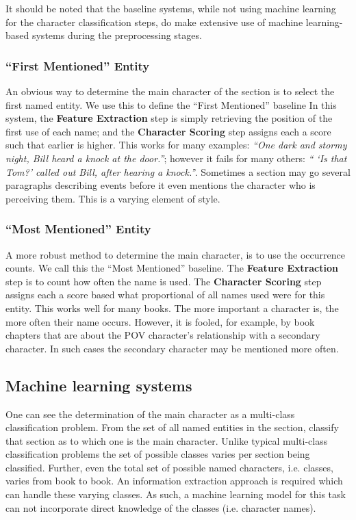 \documentclass[11pt,a4paper]{article}
\begin{document}
It should be noted that the baseline systems, while not using machine learning for the character classification steps, do make extensive use of machine learning-based systems during the preprocessing stages.

\subsubsection{``First Mentioned'' Entity}
An obvious way to determine the main character of the section is to select the first named entity.
We use this to define the ``First Mentioned'' baseline
In this system, the \textbf{Feature Extraction} step is simply retrieving the position of the first use of each name;
and the \textbf{Character Scoring} step assigns each a score such that earlier is higher.
This works for many examples: \emph{``One dark and stormy night, Bill heard a knock at the door.''};
however it fails for many others: \emph{`` `Is that Tom?' called out Bill, after hearing a knock.'}'.
Sometimes a section  may go several paragraphs describing events before it even mentions the character who is perceiving them.
This is a varying element of style.

\subsubsection{``Most Mentioned'' Entity}
A more robust method to determine the main character, is to use the occurrence counts.
We call this the ``Most Mentioned'' baseline.
The \textbf{Feature Extraction} step is to count how often the name is used.
The \textbf{Character Scoring} step assigns each a score based what proportional of all names used were for this entity.
This works well for many books.
The more important a character is, the more often their name occurs.
However, it is fooled, for example, by book chapters that are about the POV character's relationship with a secondary character.
In such cases the secondary character may be mentioned more often.

\subsection{Machine learning systems}
One can see the determination of the main character as a multi-class classification problem.
From the set of all named entities in the section, classify that section as to which one is the main character.
Unlike typical multi-class classification problems
the set of possible classes varies per section being classified.
Further, even the total set of possible named characters, i.e.  classes, varies from book to book.
An information extraction approach is required which can handle these varying classes.
As such, a machine learning model for this task can not incorporate direct knowledge of the classes (i.e. character names).
\end{document}
